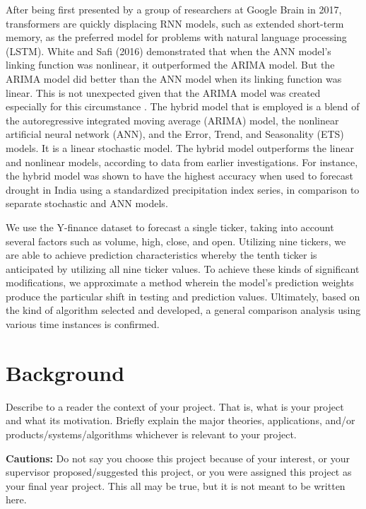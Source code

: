 After being first presented by a group of researchers at Google Brain in 2017, transformers are 
quickly displacing RNN models, such as extended short-term memory, as the preferred model for 
problems with natural language processing (LSTM). White and Safi (2016) demonstrated that when 
the ANN model's linking function was nonlinear, it outperformed the ARIMA model. But the ARIMA 
model did better than the ANN model when its linking function was linear. This is not 
unexpected given that the ARIMA model was created especially for this circumstance 
\cite{safi2021hybrid}. The hybrid model that is employed is a blend of the autoregressive 
integrated moving average (ARIMA) model, the nonlinear artificial neural network (ANN), and the 
Error, Trend, and Seasonality (ETS) models. It is a linear stochastic model. The hybrid model 
outperforms the linear and nonlinear models, according to data from earlier investigations. For 
instance, the hybrid model was shown to have the highest accuracy when used to forecast drought 
in India using a standardized precipitation index series, in comparison to separate stochastic 
and ANN models.

We use the Y-finance dataset to forecast a single ticker, taking into account several factors 
such as volume, high, close, and open. Utilizing nine tickers, we are able to achieve 
prediction characteristics whereby the tenth ticker is anticipated by utilizing all nine ticker 
values. To achieve these kinds of significant modifications, we approximate a method wherein 
the model's prediction weights produce the particular shift in testing and prediction values. 
Ultimately, based on the kind of algorithm selected and developed, a general comparison 
analysis using various time instances is confirmed. 

\section{Background}
\label{sec:into_back}
Describe to a reader the context of your project. That is, what is your project and what its 
motivation. Briefly explain the major theories, applications, and/or 
products/systems/algorithms whichever is relevant to your project.

\textbf{Cautions:} Do not say you choose this project because of your interest, or your 
supervisor proposed/suggested this project, or you were assigned this project as your final 
year project. This all may be true, but it is not meant to be written here.

